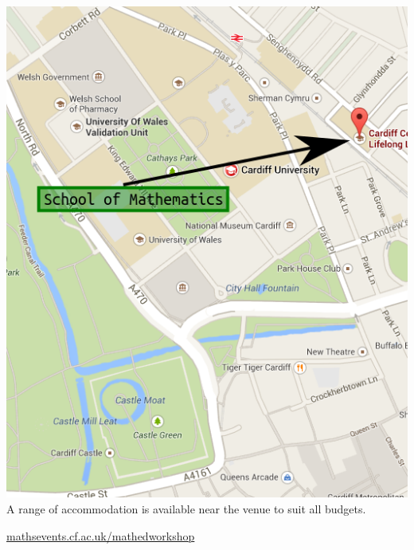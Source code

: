 \documentclass[a4paper]{leaflet}
\begin{document}
\begin{center}
\includegraphics[width=.8\textwidth]{./Images/map.png}\\
\footnotesize A range of accommodation is available near the venue to suit all budgets.

\vspace{1cm}
\url{mathsevents.cf.ac.uk/mathedworkshop}
\end{center}

\loggingall
\end{document}
